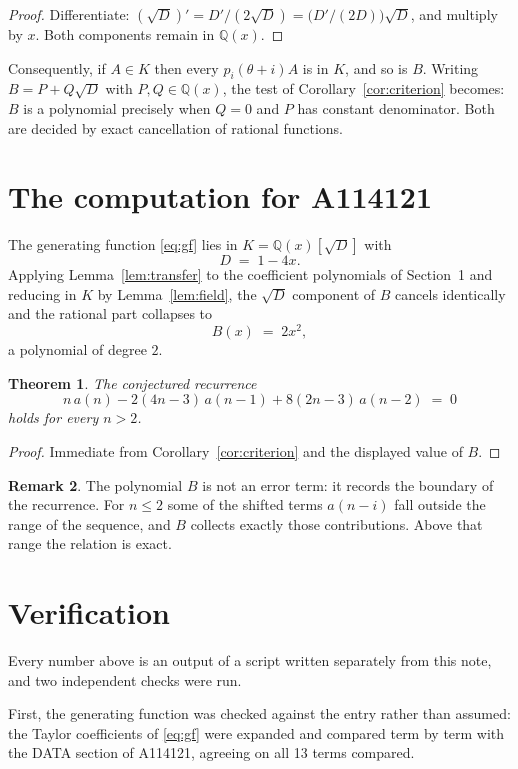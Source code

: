 \documentclass[11pt,a4paper]{article}
\theoremstyle{plain}
\newtheorem{theorem}{Theorem}
\theoremstyle{definition}
\newtheorem{remark}[theorem]{Remark}
\begin{document}
\begin{proof}
Differentiate: $(\sqrt{D})'=D'/(2\sqrt{D})=\bigl(D'/(2D)\bigr)\sqrt{D}$, and multiply by
$x$. Both components remain in $\mathbb{Q}(x)$.
\end{proof}

Consequently, if $A\in K$ then every $p_{i}(\theta+i)A$ is in $K$, and so is $B$. Writing
$B=P+Q\sqrt{D}$ with $P,Q\in\mathbb{Q}(x)$, the test of Corollary~\ref{cor:criterion}
becomes: $B$ is a polynomial precisely when $Q=0$ and $P$ has constant denominator. Both
are decided by exact cancellation of rational functions.

\section{The computation for A114121}

The generating function \eqref{eq:gf} lies in $K=\mathbb{Q}(x)[\sqrt{D}]$ with
\[
D \;=\; 1 - 4 x .
\]
Applying Lemma~\ref{lem:transfer} to the coefficient polynomials of Section~1 and reducing
in $K$ by Lemma~\ref{lem:field}, the $\sqrt{D}$ component of $B$ cancels identically and
the rational part collapses to
\[
B(x)\;=\;2 x^{2} ,
\]
a polynomial of degree $2$.

\begin{theorem}
The conjectured recurrence
\[
n\,a(n) -  2 \left(4 n - 3\right)\,a(n-1) + 8 \left(2 n - 3\right)\,a(n-2) \;=\;0
\]
holds for every $n>2$.
\end{theorem}

\begin{proof}
Immediate from Corollary~\ref{cor:criterion} and the displayed value of $B$.
\end{proof}

\begin{remark}
The polynomial $B$ is not an error term: it records the boundary of the recurrence. For
$n\le2$ some of the shifted terms $a(n-i)$ fall outside the range of the sequence,
and $B$ collects exactly those contributions. Above that range the relation is exact.
\end{remark}

\section{Verification}

Every number above is an output of a script written separately from this note, and two
independent checks were run.

First, the generating function was checked against the entry rather than assumed: the
Taylor coefficients of \eqref{eq:gf} were expanded and compared term by term with the DATA
section of A114121, agreeing on all 13 terms compared.
\end{document}
